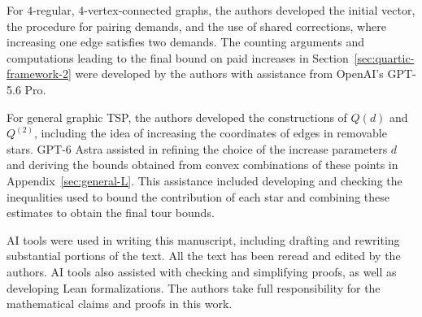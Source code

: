 \documentclass[11pt]{amsart}
\newcommand{\1}{\mathbbm{1}}
\begin{document}
For $4$-regular, $4$-vertex-connected graphs, the authors
developed the initial vector, the procedure for pairing
demands, and the use of shared corrections, where increasing
one edge satisfies two demands. The counting arguments and
computations leading to the final bound on paid increases
in Section~\ref{sec:quartic-framework-2} were developed by
the authors with assistance from OpenAI's GPT-5.6 Pro.

For general graphic TSP, the authors developed the
constructions of ${Q(d)}$ and ${Q^{(2)}}$, including the idea of
increasing the coordinates of edges in removable stars.
GPT-6 Astra assisted in refining the choice of the increase
parameters $d$ and deriving the bounds obtained from convex
{combinations of these points in
Appendix~\ref{sec:general-L}.} This assistance included developing
and checking the inequalities used to bound the contribution
of each star and combining these estimates to obtain the
final tour bounds.

AI tools were used in writing this manuscript,
including drafting and rewriting substantial portions of
the text. All the text has been reread and edited by the authors. AI tools also assisted with checking and simplifying
proofs, as well as developing Lean formalizations. The authors take full responsibility for the mathematical claims and 
proofs in this work.
\end{document}
